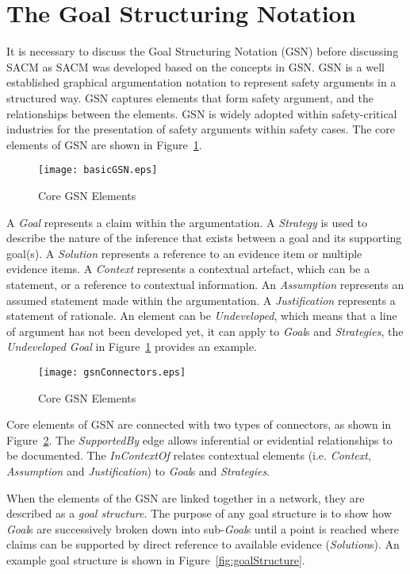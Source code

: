 \section{The Goal Structuring Notation}
\label{sec:gsn}
It is necessary to discuss the Goal Structuring Notation (GSN) before discussing SACM as SACM was developed based on the concepts in GSN. GSN is a well established graphical argumentation notation to represent safety arguments in a structured way. GSN captures elements that form safety argument, and the relationships between the elements. GSN is widely adopted within safety-critical industries for the presentation of safety arguments within safety cases. The core elements of GSN are shown in Figure~\ref{fig:gsnCore}.

\begin{figure}
	\centering
	\texttt{[image: basicGSN.eps]}
	\caption{Core GSN Elements}
	\label{fig:gsnCore}
\end{figure}

A \textit{Goal} represents a claim within the argumentation. A \textit{Strategy} is used to describe the nature of the inference that exists between a goal and its supporting goal(s). A \textit{Solution} represents a reference to an evidence item or multiple evidence items. A \textit{Context} represents a contextual artefact, which can be a statement, or a reference to contextual information. An \textit{Assumption} represents an assumed statement made within the argumentation. A \textit{Justification} represents a statement of rationale. An element can be \textit{Undeveloped}, which means that a line of argument has not been developed yet, it can apply to \textit{Goal}s and \textit{Strategies}, the \textit{Undeveloped Goal} in Figure~\ref{fig:gsnCore} provides an example. 

\begin{figure}
	\centering
	\texttt{[image: gsnConnectors.eps]}
	\caption{Core GSN Elements}
	\label{fig:gsnEdges}
\end{figure}

Core elements of GSN are connected with two types of connectors, as shown in Figure~\ref{fig:gsnEdges}. The \textit{SupportedBy} edge allows inferential or evidential relationships to be documented. The \textit{InContextOf} relates contextual elements (i.e. \textit{Context}, \textit{Assumption} and \textit{Justification}) to \textit{Goal}s and \textit{Strategies}.

When the elements of the GSN are linked together in a network, they are described as a \textit{goal structure}. The purpose of any goal structure is to show how \textit{Goal}s are successively broken down into sub-\textit{Goal}s until a point is reached where claims can be supported by direct reference to available evidence (\textit{Solution}s). An example goal structure is shown in Figure~\ref{fig:goalStructure}.

